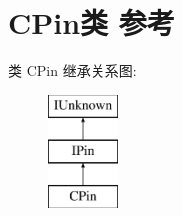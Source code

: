 \hypertarget{class_c_pin}{}\section{C\+Pin类 参考}
\label{class_c_pin}
类 C\+Pin 继承关系图\+:\begin{figure}[H]
\begin{center}
\leavevmode
\includegraphics[height=3.000000cm]{class_c_pin}
\end{center}
\end{figure}
